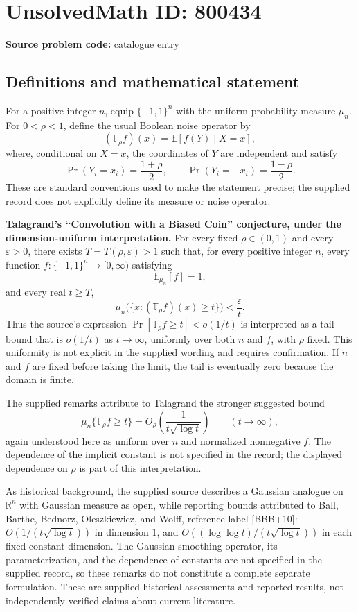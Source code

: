 \documentclass[11pt]{article}
\begin{document}
\section*{UnsolvedMath ID: 800434}
\textbf{Source problem code:} catalogue entry
\subsection{Definitions and mathematical statement}
For a positive integer \(n\), equip \(\{-1,1\}^n\) with the uniform probability measure \(\mu_n\). For \(0<\rho<1\), define the usual Boolean noise operator by
\[
(\mathbb T_\rho f)(x)=\mathbb E[f(Y)\mid X=x],
\]
where, conditional on \(X=x\), the coordinates of \(Y\) are independent and satisfy
\[
\Pr(Y_i=x_i)=\frac{1+\rho}{2},\qquad
\Pr(Y_i=-x_i)=\frac{1-\rho}{2}.
\]
These are standard conventions used to make the statement precise; the supplied record does not explicitly define its measure or noise operator.

\textbf{Talagrand's ``Convolution with a Biased Coin'' conjecture, under the dimension-uniform interpretation.} For every fixed \(\rho\in(0,1)\) and every \(\varepsilon>0\), there exists \(T=T(\rho,\varepsilon)>1\) such that, for every positive integer \(n\), every function \(f:\{-1,1\}^n\to[0,\infty)\) satisfying
\[
\mathbb E_{\mu_n}[f]=1,
\]
and every real \(t\ge T\),
\[
\mu_n\bigl(\{x:(\mathbb T_\rho f)(x)\ge t\}\bigr)<\frac{\varepsilon}{t}.
\]
Thus the source's expression \(\Pr[\mathbb T_\rho f\ge t]<o(1/t)\) is interpreted as a tail bound that is \(o(1/t)\) as \(t\to\infty\), uniformly over both \(n\) and \(f\), with \(\rho\) fixed. This uniformity is not explicit in the supplied wording and requires confirmation. If \(n\) and \(f\) are fixed before taking the limit, the tail is eventually zero because the domain is finite.

The supplied remarks attribute to Talagrand the stronger suggested bound
\[
\mu_n\{\mathbb T_\rho f\ge t\}
=O_\rho\!\left(\frac{1}{t\sqrt{\log t}}\right)
\qquad(t\to\infty),
\]
again understood here as uniform over \(n\) and normalized nonnegative \(f\). The dependence of the implicit constant is not specified in the record; the displayed dependence on \(\rho\) is part of this interpretation.

As historical background, the supplied source describes a Gaussian analogue on \(\mathbb R^n\) with Gaussian measure as open, while reporting bounds attributed to Ball, Barthe, Bednorz, Oleszkiewicz, and Wolff, reference label [BBB+10]: \(O(1/(t\sqrt{\log t}))\) in dimension \(1\), and \(O((\log\log t)/(t\sqrt{\log t}))\) in each fixed constant dimension. The Gaussian smoothing operator, its parameterization, and the dependence of constants are not specified in the supplied record, so these remarks do not constitute a complete separate formulation. These are supplied historical assessments and reported results, not independently verified claims about current literature.
\end{document}
